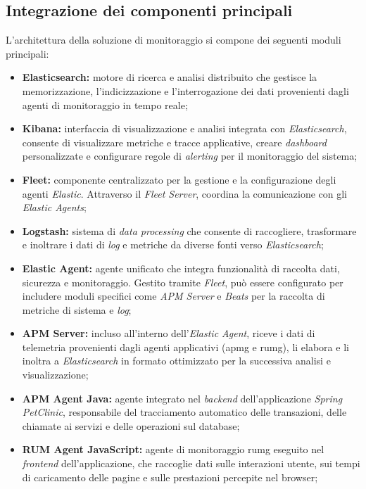 \subsection{Integrazione dei componenti principali}
L'architettura della soluzione di monitoraggio si compone dei seguenti moduli principali:
\begin{itemize}
    \item \textbf{Elasticsearch:} motore di ricerca e analisi distribuito che gestisce la memorizzazione, l'indicizzazione e l'interrogazione dei dati provenienti dagli agenti di monitoraggio in tempo reale;
    
    \item \textbf{Kibana:} interfaccia di visualizzazione e analisi integrata con \emph{Elasticsearch}, consente di visualizzare metriche e tracce applicative, creare \emph{dashboard} personalizzate e configurare regole di \emph{alerting} per il monitoraggio del sistema;
    
    \item \textbf{Fleet:} componente centralizzato per la gestione e la configurazione degli agenti \emph{Elastic}. Attraverso il \emph{Fleet Server}, coordina la comunicazione con gli \emph{Elastic Agents};
    
    \item \textbf{Logstash:} sistema di \emph{data processing} che consente di raccogliere, trasformare e inoltrare i dati di \emph{log} e metriche da diverse fonti verso \emph{Elasticsearch};

    \item \textbf{Elastic Agent:} agente unificato che integra funzionalità di raccolta dati, sicurezza e monitoraggio. Gestito tramite \emph{Fleet}, può essere configurato per includere moduli specifici come \emph{APM Server} e \emph{Beats} per la raccolta di metriche di sistema e \emph{log};

    \item \textbf{APM Server:} incluso all'interno dell'\emph{Elastic Agent}, riceve i dati di telemetria provenienti dagli agenti applicativi (\gls{apmg} e \gls{rumg}\glsfirstoccur), li elabora e li inoltra a \emph{Elasticsearch} in formato ottimizzato per la successiva analisi e visualizzazione;

    \item \textbf{APM Agent Java:} agente integrato nel \emph{backend} dell'applicazione \emph{Spring PetClinic}, responsabile del tracciamento automatico delle transazioni, delle chiamate ai servizi e delle operazioni sul database;
    
    \item \textbf{RUM Agent JavaScript:} agente di monitoraggio \gls{rumg} eseguito nel \emph{frontend} dell'applicazione, che raccoglie dati sulle interazioni utente, sui tempi di caricamento delle pagine e sulle prestazioni percepite nel browser;
    
\end{itemize}


